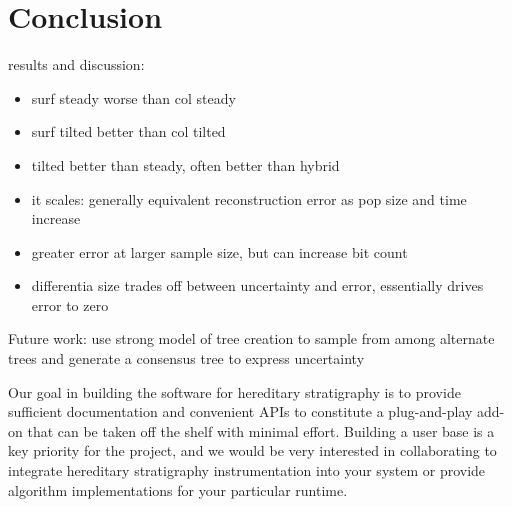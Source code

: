 \section{Conclusion} \label{sec:conclusion}

results and discussion:
\begin{itemize}
    \item surf steady worse than col steady
    \item surf tilted better than col tilted
    \item tilted better than steady, often better than hybrid
    \item it scales: generally equivalent reconstruction error as pop size and time increase
    \item greater error at larger sample size, but can increase bit count
    \item differentia size trades off between uncertainty and error, essentially drives error to zero
\end{itemize}

Future work: use strong model of tree creation to sample from among alternate trees and generate a consensus tree to express uncertainty

Our goal in building the software for hereditary stratigraphy is to provide sufficient documentation and convenient APIs to constitute a plug-and-play add-on that can be taken off the shelf with minimal effort.
Building a user base is a key priority for the project, and we would be very interested in collaborating to integrate hereditary stratigraphy instrumentation into your system or provide algorithm implementations for your particular runtime.

